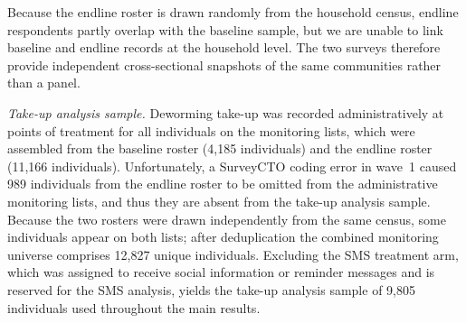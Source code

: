 Because the endline roster is drawn randomly from the household census, endline
respondents partly overlap with the baseline sample, but we are unable to link
baseline and endline records at the household level.  The two surveys therefore
provide independent cross-sectional snapshots of the same communities rather
than a panel.


\emph{Take-up analysis sample.}
Deworming take-up was recorded administratively at points of treatment for all
individuals on the monitoring lists, which were assembled from the baseline
roster (4{,}185 individuals) and the endline roster (11{,}166 individuals). Unfortunately, 
a SurveyCTO coding error in wave~1 caused 989 individuals from the endline roster to be omitted from the 
administrative monitoring lists, and thus they are absent from the take-up analysis sample.
Because the two rosters were drawn independently from the same census, some
individuals appear on both lists; after deduplication the combined monitoring
universe comprises 12{,}827 unique individuals.
Excluding the SMS treatment arm, which was assigned to receive social
information or reminder messages and is reserved for the SMS analysis, yields
the take-up analysis sample of 9{,}805 individuals used throughout the
main results.

